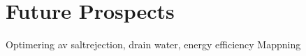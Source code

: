 \section{Future Prospects}

Optimering av saltrejection, drain water, energy efficiency
Mappning




